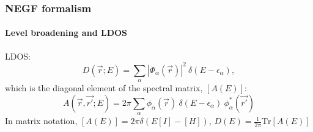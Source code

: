 \documentclass{beamer}
\begin{document}
{

    \begin{frame}

        \frametitle{NEGF formalism}
        \framesubtitle{Level broadening and LDOS}
        \scriptsize

LDOS:
\begin{equation*}
    D(\vec{r};E) = \sum_{\alpha}|\Phi_{\alpha}(\vec{r})|^{2} \  \delta(E-\epsilon_{\alpha}),
\end{equation*}
which is the diagonal element of the spectral matrix, $[A(E)]$:
\begin{equation*}
    A(\vec{r},\vec{r'};E) = 2\pi \sum_{\alpha}\phi_{\alpha}(\vec{r}) \ \delta(E-\epsilon_{\alpha}) \ \phi^{*}_{\alpha}(\vec{r'})
\end{equation*}
In matrix notation, $[A(E)] = 2\pi \delta(E[I]-[H])$, $D(E) = \frac{1}{2\pi}\text{Tr}[A(E)]$

        
    \end{frame}
}
\end{document}
